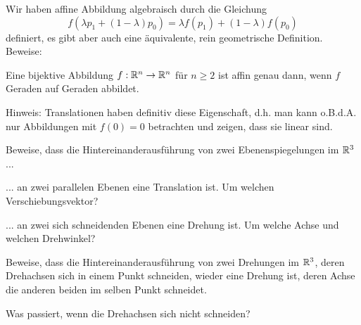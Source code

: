 \begin{sheet}

\begin{problem}[difficulty={Für $n=2$ relativ leicht, für $n=3$ mittelschwer, für $n>3$ mittelschwer bis schwer ohne Algebrakenntnisse}]
Wir haben affine Abbildung algebraisch durch die Gleichung
\[f(\lambda p_1 + (1-\lambda)p_0) = \lambda f(p_1)+(1-\lambda)f(p_0)\]
definiert, es gibt aber auch eine äquivalente, rein geometrische Definition. Beweise:

Eine bijektive Abbildung $f:\mathbb{R}^n\to\mathbb{R}^n$ für $n\geq 2$ ist affin genau dann, wenn $f$ Geraden auf Geraden abbildet.

Hinweis: Translationen haben definitiv diese Eigenschaft, d.h. man kann o.B.d.A. nur Abbildungen mit $f(0)=0$ betrachten und zeigen, dass sie linear sind.
\end{problem}

\begin{problem}[title={Komposition von Spiegelungen},difficulty={leicht bis mittel}]
Beweise, dass die Hintereinanderausführung von zwei Ebenenspiegelungen im $\mathbb{R}^3$...
\begin{subproblem}
... an zwei parallelen Ebenen eine Translation ist. Um welchen Verschiebungsvektor?
\end{subproblem}
\begin{subproblem}
... an zwei sich schneidenden Ebenen eine Drehung ist. Um welche Achse und welchen Drehwinkel?
\end{subproblem}
\end{problem}

\begin{problem}[title={Komposition von Drehungen},difficulty={Schwerer als es scheint}]
Beweise, dass die Hintereinanderausführung von zwei Drehungen im $\mathbb{R}^3$, deren Drehachsen sich in einem Punkt schneiden, wieder eine Drehung ist, deren Achse die anderen beiden im selben Punkt schneidet.

Was passiert, wenn die Drehachsen sich nicht schneiden?
\end{problem}


\end{sheet}
